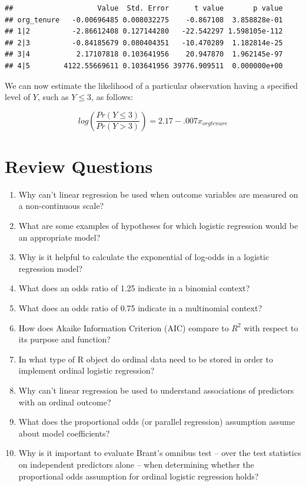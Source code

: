 \documentclass[
]{book}
\begin{document}
\begin{verbatim}
##                    Value  Std. Error      t value       p value
## org_tenure   -0.00696485 0.008032275    -0.867108  3.858828e-01
## 1|2          -2.86612408 0.127144280   -22.542297 1.598105e-112
## 2|3          -0.84185679 0.080404351   -10.470289  1.182814e-25
## 3|4           2.17107818 0.103641956    20.947870  1.962145e-97
## 4|5        4122.55669611 0.103641956 39776.909511  0.000000e+00
\end{verbatim}

We can now estimate the likelihood of a particular observation having a specified level of \(Y\), such as \(Y \le 3\), as follows:

\[ log(\frac{Pr(Y \le 3)} {Pr(Y > 3)}) =  2.17 - .007 x_{orgtenure} \]

\hypertarget{review-questions-10}{%
\section{Review Questions}\label{review-questions-10}}

\begin{enumerate}
\def\labelenumi{\arabic{enumi}.}
\item
  Why can't linear regression be used when outcome variables are measured on a non-continuous scale?
\item
  What are some examples of hypotheses for which logistic regression would be an appropriate model?
\item
  Why is it helpful to calculate the exponential of log-odds in a logistic regression model?
\item
  What does an odds ratio of 1.25 indicate in a binomial context?
\item
  What does an odds ratio of 0.75 indicate in a multinomial context?
\item
  How does Akaike Information Criterion (AIC) compare to \(R^2\) with respect to its purpose and function?
\item
  In what type of R object do ordinal data need to be stored in order to implement ordinal logistic regression?
\item
  Why can't linear regression be used to understand associations of predictors with an ordinal outcome?
\item
  What does the proportional odds (or parallel regression) assumption assume about model coefficients?
\item
  Why is it important to evaluate Brant's omnibus test -- over the test statistics on independent predictors alone -- when determining whether the proportional odds assumption for ordinal logistic regression holds?
\end{enumerate}
\end{document}
